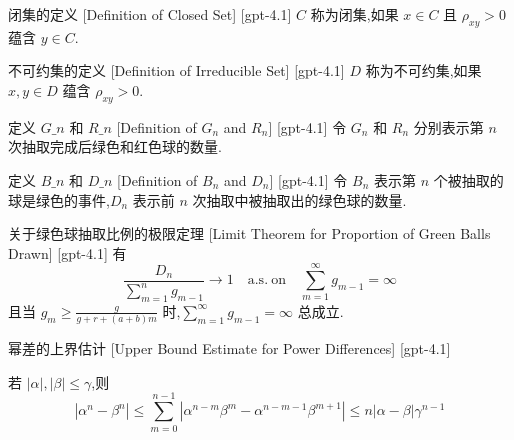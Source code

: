 \documentclass[UTF8]{ctexart}
\begin{document}
    
    
    \begin{dfn}
        {闭集的定义}
        [Definition of Closed Set]
        [gpt-4.1]
        $C$ 称为闭集,如果 $x \in C$ 且 $\rho_{xy} > 0$ 蕴含 $y \in C$.
    \end{dfn}
    
    
    
    \begin{dfn}
        {不可约集的定义}
        [Definition of Irreducible Set]
        [gpt-4.1]
        $D$ 称为不可约集,如果 $x, y \in D$ 蕴含 $\rho_{xy} > 0$.
    \end{dfn}
    
    
    
    \begin{dfn}
        {定义 $G\_n$ 和 $R\_n$}
        [Definition of $G_n$ and $R_n$]
        [gpt-4.1]
        令 $G_n$ 和 $R_n$ 分别表示第 $n$ 次抽取完成后绿色和红色球的数量.
    \end{dfn}
    
    
    
    \begin{dfn}
        {定义 $B\_n$ 和 $D\_n$}
        [Definition of $B_n$ and $D_n$]
        [gpt-4.1]
        令 $B_n$ 表示第 $n$ 个被抽取的球是绿色的事件,$D_n$ 表示前 $n$ 次抽取中被抽取出的绿色球的数量.
    \end{dfn}
    
    
    
    \begin{thm}
        {关于绿色球抽取比例的极限定理}
        [Limit Theorem for Proportion of Green Balls Drawn]
        [gpt-4.1]
        有
\[
\frac{D_n}{\sum_{m=1}^n g_{m-1}} \to 1 \quad \mathrm{a.s.\ on} \quad \sum_{m=1}^{\infty} g_{m-1} = \infty
\]
且当 $g_m \geq \frac{g}{g + r + (a+b)m}$ 时,$\sum_{m=1}^{\infty} g_{m-1} = \infty$ 总成立.
    \end{thm}
    
    
    
    \begin{ppt}
        {幂差的上界估计}
        [Upper Bound Estimate for Power Differences]
        [gpt-4.1]
        
若 $|\alpha|, |\beta| \leq \gamma$,则
\[
|\alpha^n - \beta^n| \leq \sum_{m=0}^{n-1} |\alpha^{n-m} \beta^m - \alpha^{n-m-1} \beta^{m+1}| \leq n|\alpha - \beta|\gamma^{n-1}
\]

    \end{ppt}
    
\end{document}
